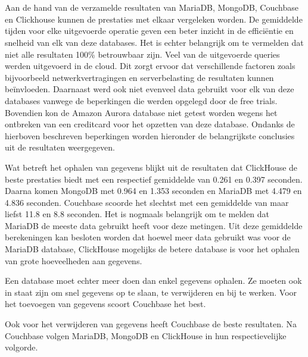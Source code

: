 \newpage


\section{}%
\label{sec:test-conclusie}

Aan de hand van de verzamelde resultaten van MariaDB, MongoDB, Couchbase en Clickhouse kunnen de prestaties met elkaar vergeleken worden. De gemiddelde tijden voor elke uitgevoerde operatie geven een beter inzicht in de efficiëntie en snelheid van elk van deze databases. Het is echter belangrijk om te vermelden dat niet alle resultaten 100\% betrouwbaar zijn. Veel van de uitgevoerde queries werden uitgevoerd in de cloud. Dit zorgt ervoor dat verschillende factoren zoals bijvoorbeeld netwerkvertragingen en serverbelasting de resultaten kunnen beïnvloeden. Daarnaast werd ook niet evenveel data gebruikt voor elk van deze databases vanwege de beperkingen die werden opgelegd door de free trials. Bovendien kon de Amazon Aurora database niet getest worden wegens het ontbreken van een creditcard voor het opzetten van deze database. Ondanks de hierboven beschreven beperkingen worden hieronder de belangrijkste conclusies uit de resultaten weergegeven.

\vspace{5mm}

Wat betreft het ophalen van gegevens blijkt uit de resultaten dat ClickHouse de beste prestaties biedt met een respectief gemiddelde van 0.261 en 0.397 seconden. Daarna komen MongoDB met 0.964 en 1.353 seconden en MariaDB met 4.479 en 4.836 seconden. Couchbase scoorde het slechtst met een gemiddelde van maar liefst 11.8 en 8.8 seconden. Het is nogmaals belangrijk om te melden dat MariaDB de meeste data gebruikt heeft voor deze metingen. Uit deze gemiddelde berekeningen kan besloten worden dat hoewel meer data gebruikt was voor de MariaDB database, ClickHouse mogelijks de betere database is voor het ophalen van grote hoeveelheden aan gegevens. 

\vspace{5mm}

Een database moet echter meer doen dan enkel gegevens ophalen. Ze moeten ook in staat zijn om snel gegevens op te slaan, te verwijderen en bij te werken. Voor het toevoegen van gegevens scoort Couchbase het best.

Ook voor het verwijderen van gegevens heeft Couchbase de beste resultaten. Na Couchbase volgen MariaDB, MongoDB en ClickHouse in hun respectievelijke volgorde.


